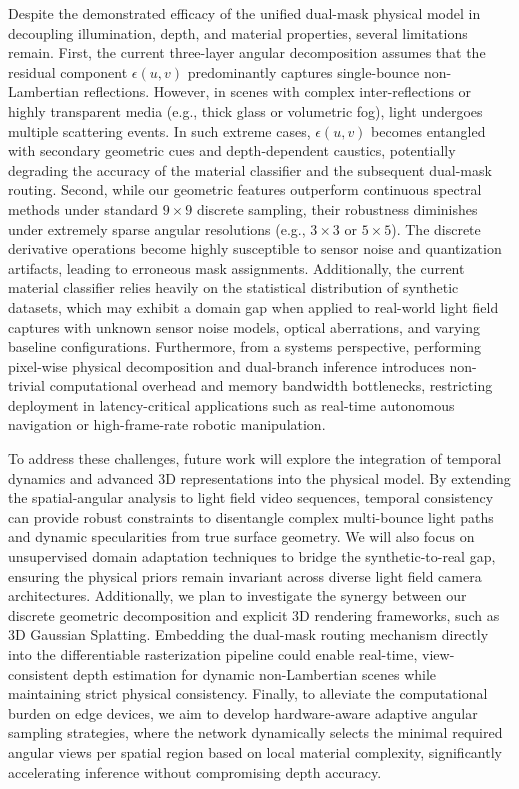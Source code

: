 \documentclass[lettersize,journal]{IEEEtran}
\begin{document}
Despite the demonstrated efficacy of the unified dual-mask physical model in decoupling illumination, depth, and material properties, several limitations remain. First, the current three-layer angular decomposition assumes that the residual component $\epsilon(u,v)$ predominantly captures single-bounce non-Lambertian reflections. However, in scenes with complex inter-reflections or highly transparent media (e.g., thick glass or volumetric fog), light undergoes multiple scattering events. In such extreme cases, $\epsilon(u,v)$ becomes entangled with secondary geometric cues and depth-dependent caustics, potentially degrading the accuracy of the material classifier and the subsequent dual-mask routing. Second, while our geometric features outperform continuous spectral methods under standard $9 \times 9$ discrete sampling, their robustness diminishes under extremely sparse angular resolutions (e.g., $3 \times 3$ or $5 \times 5$). The discrete derivative operations become highly susceptible to sensor noise and quantization artifacts, leading to erroneous mask assignments. Additionally, the current material classifier relies heavily on the statistical distribution of synthetic datasets, which may exhibit a domain gap when applied to real-world light field captures with unknown sensor noise models, optical aberrations, and varying baseline configurations. Furthermore, from a systems perspective, performing pixel-wise physical decomposition and dual-branch inference introduces non-trivial computational overhead and memory bandwidth bottlenecks, restricting deployment in latency-critical applications such as real-time autonomous navigation or high-frame-rate robotic manipulation.

To address these challenges, future work will explore the integration of temporal dynamics and advanced 3D representations into the physical model. By extending the spatial-angular analysis to light field video sequences, temporal consistency can provide robust constraints to disentangle complex multi-bounce light paths and dynamic specularities from true surface geometry. We will also focus on unsupervised domain adaptation techniques to bridge the synthetic-to-real gap, ensuring the physical priors remain invariant across diverse light field camera architectures. Additionally, we plan to investigate the synergy between our discrete geometric decomposition and explicit 3D rendering frameworks, such as 3D Gaussian Splatting. Embedding the dual-mask routing mechanism directly into the differentiable rasterization pipeline could enable real-time, view-consistent depth estimation for dynamic non-Lambertian scenes while maintaining strict physical consistency. Finally, to alleviate the computational burden on edge devices, we aim to develop hardware-aware adaptive angular sampling strategies, where the network dynamically selects the minimal required angular views per spatial region based on local material complexity, significantly accelerating inference without compromising depth accuracy.
\end{document}
